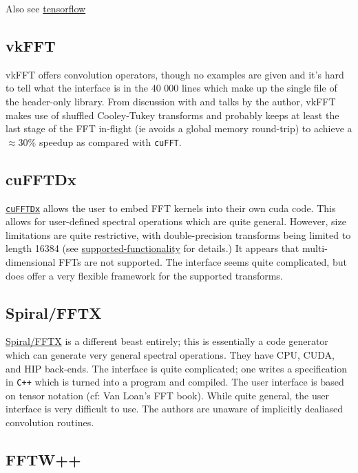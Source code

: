 \documentclass[12pt]{article}
\renewcommand{\(}{\left(}
\renewcommand{\)}{\right)}
\begin{document}
Also see
\href{https://www.tensorflow.org/api_docs/python/tf/signal/}{tensorflow}

\subsection{vkFFT}

vkFFT offers convolution operators, though no examples are given and
it's hard to tell what the interface is in the 40 000 lines which make
up the single file of the header-only library.  From discussion with
and talks by the author, vkFFT makes use of shuffled Cooley-Tukey
transforms and probably keeps at least the last stage of the FFT
in-flight (ie avoids a global memory round-trip) to achieve a
$\approx30\%$ speedup as compared with \texttt{cuFFT}.

\subsection{cuFFTDx}

\href{https://docs.nvidia.com/cuda/cufftdx/index.html}{\texttt{cuFFTDx}}
allows the user to embed FFT kernels into their own cuda code.  This
allows for user-defined spectral operations which are quite general.
However, size limitations are quite restrictive, with double-precision
transforms being limited to length 16384 (see
\href{https://docs.nvidia.com/cuda/cufftdx/requirements_func.html#supported-functionality}{supported-functionality}
for details.)  It appears that multi-dimensional FFTs are not
supported.  The interface seems quite complicated, but does offer a
very flexible framework for the supported transforms.

\subsection{Spiral/FFTX}

\href{http://www.spiral.net/software/fftx.html}{Spiral/FFTX} is a
different beast entirely; this is essentially a code generator which
can generate very general spectral operations.  They have CPU, CUDA,
and HIP back-ends.  The interface is quite complicated; one writes a
specification in \texttt{C++} which is turned into a program and
compiled.  The user interface is based on tensor notation (cf: Van
Loan's FFT book).  While quite general, the user interface is very
difficult to use.  The authors are unaware of implicitly dealiased
convolution routines.

\subsection{FFTW++}
\end{document}
